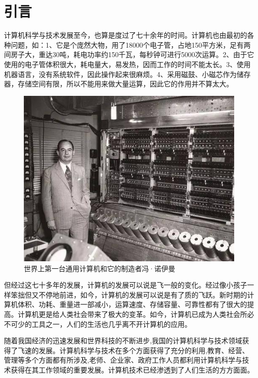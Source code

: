 \documentclass{article}
\begin{document}
\thispagestyle{empty}
\newpage
\setcounter{page}{1}
\section{引言}
计算机科学与技术发展至今，也算是度过了七十余年的时间。计算机也由最初的各种问题，如：1、它是个庞然大物，用了18000个电子管，占地150平方米，足有两间房子大，重达30吨，耗电功率约150千瓦，每秒钟可进行5000次运算。2、由于它使用的电子管体积很大，耗电量大，易发热，因而工作的时间不能太长。3、使用机器语言，没有系统软件，因此操作起来很麻烦。4、采用磁鼓、小磁芯作为储存器，存储空间有限，所以不能用来做大量运算，因此它的作用并不算太大。\par
\begin{figure}[h!]
	\centering
	\includegraphics[scale=0.7]{jisuanji}
	\caption{世界上第一台通用计算机和它的制造者冯·诺伊曼}
	\label{fig:jisuanji}
\end{figure}
但经过这七十多年的发展，计算机的发展可以说是飞一般的变化。经过像小孩子一样笨拙但又不停地前进，如今，计算机的发展可以说是有了质的飞跃。新时期的计算机体积、功耗、重量进一部减小，运算速度、存储容量、可靠性都有了很大的提高。计算机更是给人类社会带来了极大的变革。如今，计算机已成为人类社会所必不可少的工具之一，人们的生活也几乎离不开计算机的应用。\par 
随着我国经济的迅速发展和世界科技的不断进步,我国的计算机科学与技术领域获得了飞速的发展。计算机科学与技术在多个方面获得了充分的利用,教育、经营、管理等多个方面都有所涉及,老师、企业家、政府工作人员都利用计算机科学与技术获得在其工作领域的重要发展。\citep{b}计算机技术已经渗透到了人们生活的方方面面。\par
\end{document}
